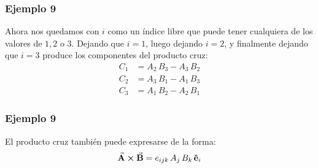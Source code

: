 \documentclass[12pt]{beamer}
\begin{document}
\begin{frame}
\frametitle{Ejemplo 9}
Ahora nos quedamos con $i$ como un índice libre que puede tener cualquiera de los valores de $1, 2$ o $3$. Dejando que $i = 1$, luego dejando $i = 2$, y finalmente dejando que $i = 3$ produce los componentes del producto cruz:
\begin{align*}
C_{1} &= A_{2} \, B_{3} - A_{3} \, B_{2} \\[0.5em]
C_{2} &= A_{3} \, B_{1} - A_{1} \, B_{3} \\[0.5em]
C_{3} &= A_{1} \, B_{2} - A_{2} \, B_{1}
\end{align*}
\end{frame}
\begin{frame}
\frametitle{Ejemplo 9}
El producto cruz también puede expresarse de la forma:
\begin{align*}
\va{A} \cp \va{B} = e_{ijk} \, A_{j} \, B_{k} \, \vu{e}_{i}
\end{align*}
\end{frame}
\end{document}
